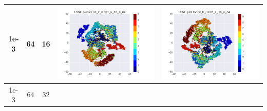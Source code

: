 \documentclass[12pt]{report}
\begin{document}
\begin{table}[H]
\begin{tabular}{ | c | c | c | c || c |}
        \\ \hline
     1e-3 & 64 & 16 &
    \begin{minipage}{.3\textwidth}
      \includegraphics[scale=0.25]{cd_lr_0_001_k_16_n_64.png}
    \end{minipage} &
    \begin{minipage}{.3\textwidth}
      \includegraphics[scale=0.25]{test_cd_lr_0_001_k_16_n_64.png}
    \end{minipage}
        \\ \hline
    1e-3 & 64 & 32 &
    \begin{minipage}{.3\textwidth}

\end{minipage}
\end{tabular}
\end{table}
\end{document}
